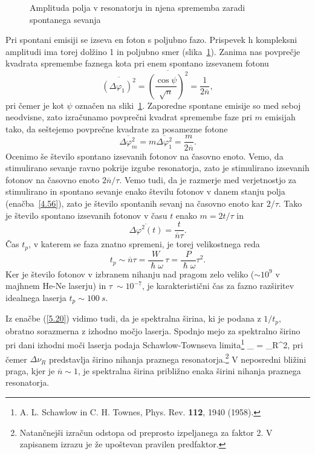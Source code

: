 \begin{figure}[h]
\centering
\def\svgwidth{70truemm} 

\caption{Amplituda polja v resonatorju in njena sprememba zaradi 
spontanega sevanja}
\label{fig:fazor}
\end{figure}

Pri spontani emisiji se izseva en foton s poljubno fazo. Prispevek h kompleksni
amplitudi ima torej dolžino 1 in poljubno smer (slika~\ref{fig:fazor}). Zanima
nas povprečje kvadrata spremembe faznega kota pri enem spontano izsevanem fotonu
\begin{equation}
\overline{(\Delta \varphi_{1})^{2}}=\overline{\left(\frac{\cos\psi}{\sqrt{n} }\right)^2}
=\frac{1}{2\overline{n}},
\label{5.17}
\end{equation}
pri čemer je kot $\psi$ označen na sliki~\ref{fig:fazor}. 
Zaporedne spontane emisije so med seboj neodvisne, zato izračunamo
povprečni kvadrat spremembe faze pri $m$ emisijah tako, da seštejemo
povprečne kvadrate za posamezne fotone 
\begin{equation}
\overline{\Delta \varphi_{m}^{2}}=m\overline{\Delta \varphi_{1}^{2}}=
\frac{m}{2\overline{n}}.
\label{5.18}
\end{equation}
Ocenimo še število spontano izsevanih fotonov na časovno enoto.
Vemo, da stimulirano sevanje ravno pokrije izgube resonatorja, zato je
stimulirano izsevanih fotonov na časovno enoto $2\overline{n}/\tau $. Vemo tudi, 
da je razmerje med verjetnostjo za stimulirano in spontano sevanje enako 
številu fotonov v danem stanju polja (enačba~\ref{4.56}), zato je število 
spontanih sevanj na časovno enoto kar $2/\tau $.
Tako je število spontano izsevanih fotonov v času $t$ enako $m=2t/\tau $ in 
\begin{equation}
\overline{\Delta \varphi^{2}(t)}=\frac{t}{\overline{n}\tau }.
\label{5.19}
\end{equation}
Čas $t_{p}$, v katerem se faza znatno spremeni, je torej
velikostnega reda 
\begin{equation}
t_{p}\sim \overline{n}\tau =\frac{W}{\hslash \omega }\,\tau =\frac{P}{\hslash
\omega }\tau ^{2}.
\label{5.20}
\end{equation}
Ker je število fotonov v izbranem nihanju nad pragom zelo veliko ($\sim 10^9$ v majhnem 
He-Ne laserju) in $\tau~\sim 10^{-7}$, je karakteristični
čas za fazno razširitev idealnega laserja $t_p \sim 100~\si{s}$. 

Iz enačbe (\ref{5.20}) vidimo tudi, da je spektralna širina, ki je
podana z $1/t_{p}$, obratno sorazmerna z izhodno močjo laserja. Spodnjo
mejo za spektralno širino pri dani izhodni moči laserja 
podaja Schawlow-Townseva limita\footnote{A. 
L. Schawlow in C. H. Townes, Phys. Rev. {\bf 112}, 1940 (1958). }
\beq
\Delta \nu_ =  \Delta \nu_R^2,
\eeq
pri čemer $\Delta \nu_R$ predstavlja širino nihanja praznega 
resonatorja.\footnote{Natančnejši izračun odstopa od preprosto izpeljanega za 
faktor 2. V zapisanem izrazu je že upoštevan pravilen predfaktor.}
V neposredni bližini praga, kjer je $\overline{n}\sim 1$, je 
spektralna širina približno enaka širini nihanja praznega resonatorja.

